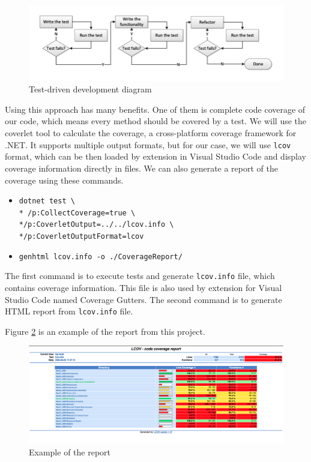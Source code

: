 \begin{figure}[H]
    \centering
    \includegraphics[width=\textwidth]{content/Test-Driven-Development-activities.png}
    \caption{Test-driven development diagram \cite{madeyski_continuous_2013}}
    \label{fig:tddDiagram}
\end{figure}

Using this approach has many benefits. One of them is complete code coverage of our code, which means every method should be covered by a test.
We will use the coverlet tool to calculate the coverage, a cross-platform coverage framework for .NET. \cite{noauthor_coverlet_2022}
It supports multiple output formats, but for our case, we will use \texttt{lcov} format, which can be then loaded by extension in Visual Studio Code and display coverage information directly in files.
We can also generate a report of the coverage using these commands.
\begin{itemize}
    \item {\texttt{dotnet test \textbackslash\\*
              /p:CollectCoverage=true \textbackslash\\*/p:CoverletOutput=../../lcov.info \textbackslash\\*/p:CoverletOutputFormat=lcov}}
    \item {\texttt{genhtml lcov.info -o ./CoverageReport/}}
\end{itemize}
The first command is to execute tests and generate \texttt{lcov.info} file, which contains coverage information. This file is also used by extension for Visual Studio Code
named Coverage Gutters.
The second command is to generate HTML report from \texttt{lcov.info} file.

Figure \ref{fig:report} is an example of the report from this project.

\begin{figure}[H]
    \centering
    \includegraphics[width=\textwidth]{content/coverage_report.png}
    \caption{Example of the report}
    \label{fig:report}
\end{figure}

